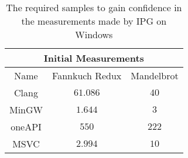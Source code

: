 \begin{table}[H]
    \centering
    \begin{tabular}{|| c | c | c ||}
    \hline
    \multicolumn{3}{||c||}{Initial Measurements} \\ [0.5ex] \hline\hline
    Name & Fannkuch Redux & Mandelbrot \\\hline
    Clang & $61.086$ & $40$ \\
    MinGW & $1.644$ & $3$ \\
    oneAPI & $550$ & $222$ \\
    MSVC & $2.994$ & $10$ \\\hline
    \end{tabular}
    \caption{The required samples to gain confidence in the measurements made by IPG on Windows}
    \label{tab:initial-measurements}
\end{table}